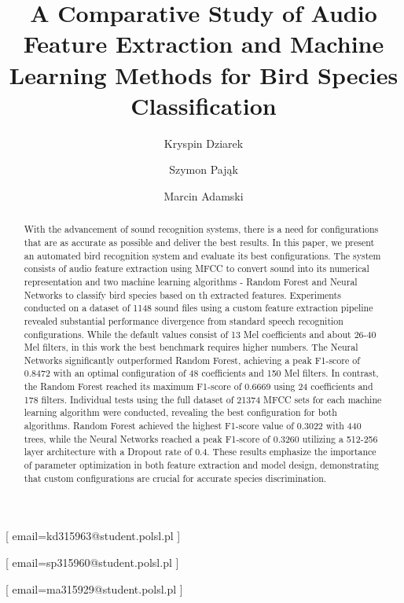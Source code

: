 \documentclass[
onecolumn,
]{ceurart}
\begin{document}
	
	
	
	\title{A Comparative Study of Audio Feature Extraction and Machine Learning Methods for Bird Species Classification}
	
	\tnotemark[1]
	
	\author[1]{Kryspin Dziarek}[%
	email=kd315963@student.polsl.pl
	]
	\author[1]{Szymon Pająk}[%
	email=sp315960@student.polsl.pl
	]
	\author[1]{Marcin Adamski}[%
	email=ma315929@student.polsl.pl
	]
	\address[1]{Faculty of Applied Mathematics, Silesian University of Technology, Kaszubska 23, 44100 Gliwice, POLAND}
	
	\begin{abstract}
		With the advancement of sound recognition systems, there is a need for configurations that are as accurate as possible and deliver the best results. In this paper, we present an automated bird recognition system and evaluate its best configurations. The system consists of audio feature extraction using MFCC to convert sound into its numerical representation and two machine learning algorithms - Random Forest and Neural Networks to classify bird species based on th extracted features. Experiments conducted on a dataset of 1148 sound files using a custom feature extraction pipeline revealed substantial performance divergence from standard speech recognition configurations. While the default values consist of 13 Mel coefficients and about 26-40 Mel filters, in this work the best benchmark requires higher numbers. The Neural Networks significantly outperformed Random Forest, achieving a peak F1-score of 0.8472 with an optimal configuration of 48 coefficients and 150 Mel filters. In contrast, the Random Forest reached its maximum F1-score of 0.6669 using 24 coefficients and 178 filters. Individual tests using the full dataset of 21374 MFCC sets for each machine learning algorithm were conducted, revealing the best configuration for both algorithms. Random Forest achieved the highest F1-score value of 0.3022 with 440 trees, while the Neural Networks reached a peak F1-score of 0.3260 utilizing a 512-256 layer architecture with a Dropout rate of 0.4. These results emphasize the importance of parameter optimization in both feature extraction and model design, demonstrating that custom configurations are crucial for accurate species discrimination.
	\end{abstract}
	
\end{document}
